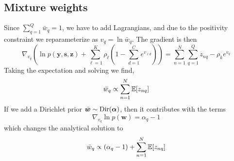 \documentclass{article}
\newcommand{\source}{s}
\newcommand{\sourcevec}{\bm{\source}}
\newcommand{\obs}{y}
\newcommand{\obsvec}{\bm{\obs}}
\newcommand{\weight}{w}
\newcommand{\weightvec}{\bm{\weight}}
\newcommand{\compweight}{\bar{\weight}}
\newcommand{\compweightvec}{\bar{\bm{\weight}}}
\newcommand{\assign}{z}
\newcommand{\assignvec}{\bm{\assign}}
\begin{document}
\subsection{Mixture weights}
Since $\sum_{q=1}^{Q}\compweight_{q}=1$, we have to add Lagrangians, and due to the positivity constraint we reparameterize as $v_{q}=\ln\compweight_{q}$. The gradient is then  
\begin{equation}
\nabla_{v_{q}}\left(\ln p(\obsvec,\sourcevec,\assignvec) +\sum_{\ell=1}^{K}\rho_\ell(1-\sum_{d=1}^{C}e^{v_{\ell d}})\right)=\sum_{n=1}^N\sum_{q=1}^Q\assign_{nq}-\rho_ke^{v_{q}}
\end{equation}
Taking the expectation and solving we find,
\begin{equation}
\compweight_{q}\propto\sum_{n=1}^{N}\E{\assign_{nq}}
\end{equation}
If we add a Dirichlet prior $\compweightvec\sim\dirrnd(\bm{\alpha})$, then it contributes with the terms 
\begin{equation}
\nabla_{v_{q}}\ln p(\weightvec)=\alpha_{q}-1
\end{equation}
which changes the analytical solution to
\begin{equation}
\compweight_{q}\propto (\alpha_{q}-1)+\sum_{n=1}^{N}\E{\assign_{nq}}
\end{equation}
\end{document}

